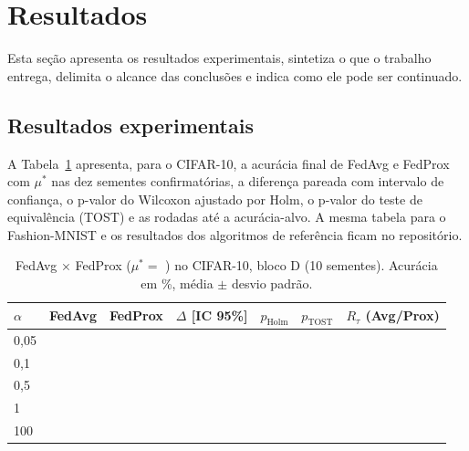 \section{Resultados}
\label{resultados}

Esta seção apresenta os resultados experimentais, sintetiza o que o trabalho entrega, delimita o alcance das conclusões e indica como ele pode ser continuado.

\subsection{Resultados experimentais}


A Tabela~\ref{tab:resultados} apresenta, para o CIFAR-10, a acurácia final de FedAvg e FedProx com $\mu^*$ nas dez sementes confirmatórias, a diferença pareada com intervalo de confiança, o p-valor do Wilcoxon ajustado por Holm, o p-valor do teste de equivalência (TOST) e as rodadas até a acurácia-alvo. A mesma tabela para o Fashion-MNIST e os resultados dos algoritmos de referência ficam no repositório.

\begin{table}[ht]
    \centering\scriptsize
    \caption{FedAvg × FedProx ($\mu^* = $ ) no CIFAR-10, bloco D (10 sementes). Acurácia em \%, média $\pm$ desvio padrão.}
    \label{tab:resultados}
    \setlength{\tabcolsep}{3pt}
    \begin{tabular}{@{}lcccccc@{}}
        \toprule
        $\alpha$ & FedAvg & FedProx & $\Delta$ [IC 95\%] & $p_{\text{Holm}}$ & $p_{\text{TOST}}$ & $R_\tau$ (Avg/Prox) \\
        \midrule
        0,05 & \pendente{--} & \pendente{--} & \pendente{--} & \pendente{--} & \pendente{--} & \pendente{--} \\
        0,1  & \pendente{--} & \pendente{--} & \pendente{--} & \pendente{--} & \pendente{--} & \pendente{--} \\
        0,5  & \pendente{--} & \pendente{--} & \pendente{--} & \pendente{--} & \pendente{--} & \pendente{--} \\
        1    & \pendente{--} & \pendente{--} & \pendente{--} & \pendente{--} & \pendente{--} & \pendente{--} \\
        100  & \pendente{--} & \pendente{--} & \pendente{--} & \pendente{--} & \pendente{--} & \pendente{--} \\
        \bottomrule
    \end{tabular}
\end{table}

